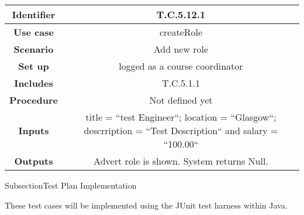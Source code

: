 \begin{tabular}{|c|c|}
\hline \textbf{Identifier} & T.C.5.12.1\\
\hline \textbf{Use case} & createRole\\
\hline \textbf{Scenario} & Add new role\\
\hline \textbf{Set up} & logged as a course coordinator\\
\hline \textbf{Includes} & T.C.5.1.1\\
\hline \textbf{Procedure} & Not defined yet\\
\hline \textbf{Inputs} & title = ``test Engineer``; location = ``Glasgow``; descrription = ``Test Description`` and salary = ``100.00``\\
\hline \textbf{Outputs} & Advert role is shown. System returns Null.\\
\hline
\end{tabular}

Subsection{Test Plan Implementation}

These test cases will be implemented using the JUnit test harness within Java. 


